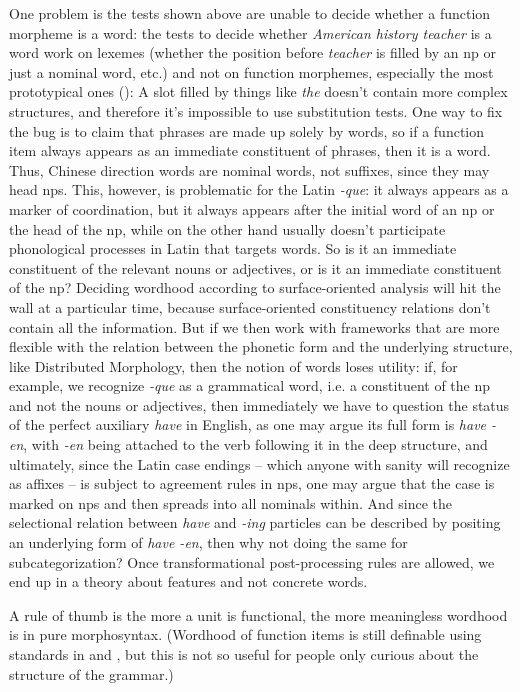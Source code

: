 \documentclass[UTF8, a4paper, oneside, scheme=plain]{ctexart}
\newcommand*{\corpus}[1]{\emph{#1}}
\begin{document}
One problem is the tests shown above are unable to decide whether a function morpheme is a word:
the tests to decide whether \corpus{American history teacher} is a word work on lexemes 
(whether the position before \corpus{teacher} is filled by an \ac{np} or just a nominal word, etc.)
and not on function morphemes, especially the most prototypical ones
():
A slot filled by things like \corpus{the} doesn't contain more complex structures,
and therefore it's impossible to use substitution tests.
One way to fix the bug is to 
claim that phrases are made up solely by words,
so if a function item always appears as an immediate constituent of phrases,
then it is a word.
Thus, Chinese direction words are nominal words, not suffixes,
since they may head \ac{np}s.
This, however, is problematic for the Latin \corpus{-que}:
it always appears as a marker of coordination,
but it always appears after the initial word of an \ac{np} or the head of the \ac{np},
while on the other hand usually doesn't participate phonological processes in Latin that targets words.
So is it an immediate constituent of the relevant nouns or adjectives,
or is it an immediate constituent of the \ac{np}?
Deciding wordhood according to surface-oriented analysis will hit the wall at a particular time,
because surface-oriented constituency relations don't contain all the information.
But if we then work with frameworks 
that are more flexible with the relation between the phonetic form and the underlying structure, 
like Distributed Morphology,
then the notion of words loses utility:
if, for example, we recognize \corpus{-que} as a grammatical word, 
i.e. a constituent of the \ac{np} and not the nouns or adjectives,
then immediately we have to question the status of the perfect auxiliary \corpus{have} in English,
as one may argue its full form is \corpus{have -en},
with \corpus{-en} being attached to the verb following it in the deep structure,
and ultimately, since the Latin case endings 
-- which anyone with sanity will recognize as affixes -- 
is subject to agreement rules in \ac{np}s,
one may argue that the case is marked on \ac{np}s and then spreads into all nominals within.
And since the selectional relation between \corpus{have} and \corpus{-ing} particles 
can be described by positing an underlying form of \corpus{have -en},
then why not doing the same for subcategorization?
Once transformational post-processing rules are allowed,
we end up in a theory about features and not concrete words.

A rule of thumb is the more a unit is functional,
the more meaningless wordhood is in pure morphosyntax.
(Wordhood of function items is still definable using standards 
in  and ,
but this is not so useful for people only curious about the structure of the grammar.)
\end{document}
